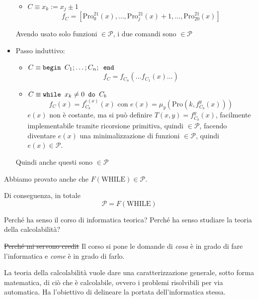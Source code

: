 \documentclass[12pt, answers]{exam}
\theoremstyle{plain}
\newcommand{\while}{\text{WHILE}}
\newcommand{\cp}{\mathcal{P}}
\newcommand{\pro}{\text{Pro}}
\begin{document}
\begin{questions}
\begin{solution}
\begin{itemize}
\begin{itemize}
                    \item $C \equiv x_k := x_j \pm 1$
                    $$ f_C = \left[\pro^{21}_0 (x), \dots, \pro^{21}_j (x) + 1, \dots, \pro^{21}_20 (x) \right] $$
                \end{itemize}
                Avendo usato solo funzioni $\in \cp$, i due comandi sono $\in \cp$
                
                \item Passo induttivo: 
                \begin{itemize}
                    \item $C \equiv \text{\texttt{begin }} C_1; \dots; C_n; \text{\texttt{ end}}$
                    $$ f_C = f_{C_n} ( \dots f_{C_1}(x) \dots )$$
                    
                    \item $C \equiv \text{\texttt{while }} x_k \neq 0 \text{\texttt{ do }} C_b$
                    $$ f_C (x) = f_{C_b}^{e(x)} (x) \text{ con } e(x) = \mu_y (\pro(k, f_{C_b}^y (x))) $$
                    $e(x)$ non è costante, ma si può definire $T(x,y) = f_{C_b}^y (x)$, facilmente implementabile tramite ricorsione primitiva, quindi $\in \cp$, facendo diventare $e(x)$ una minimalizzazione di funzioni $\in \cp$, quindi $e(x) \in \cp$. 
                \end{itemize}
                Quindi anche questi sono $\in \cp$
            \end{itemize}
            Abbiamo provato anche che $F(\while) \in \cp$.
            
            Di conseguenza, in totale
            $$ \cp = F(\while) $$ 
        \end{solution}
        
        \question Perché ha senso il corso di informatica teorica? Perché ha senso studiare la teoria della calcolabilità?
        
        \begin{solution}
            \sout{Perché mi servono credit} Il corso si pone le domande di \textit{cosa} è in grado di fare l'informatica e \textit{come} è in grado di farlo.
            
            La teoria della calcolabilità vuole dare una caratterizzazione generale, sotto forma matematica, di ciò che è calcolabile, ovvero i problemi risolvibili per via automatica. Ha l'obiettivo di delineare la portata dell'informatica stessa.
        \end{solution}
        

\end{questions}
\end{document}
